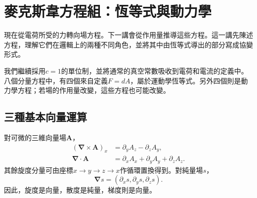 \section{麥克斯韋方程組：恆等式與動力學}

現在從電荷所受的力轉向場方程。下一講會從作用量推導這些方程。這一講先陳述方程，理解它們在邏輯上的兩種不同角色，並將其中由恆等式導出的部分寫成協變形式。

\begin{classroomqa}
\end{classroomqa}

\begin{classroomqa}
\end{classroomqa}

我們繼續採用\(c=1\)的單位制，並將通常的真空常數吸收到電荷和電流的定義中。八個分量方程中，有四個來自定義\(F=dA\)，屬於運動學恆等式。另外四個則是動力學方程；若場的作用量改變，這些方程也可能改變。

\subsection{三種基本向量運算}

對可微的三維向量場\(\mathbf A\)，
\begin{align}
(\boldsymbol\nabla\times\mathbf A)_x
&=
\partial_yA_z-\partial_zA_y,
\\
\boldsymbol\nabla\cdot\mathbf A
&=
\partial_xA_x+\partial_yA_y+\partial_zA_z.
\end{align}
其餘旋度分量可由座標\(x\to y\to z\to x\)作循環置換得到。對純量場\(s\)，
\begin{equation}
\boldsymbol\nabla s
=
(\partial_xs,\partial_ys,\partial_zs).
\end{equation}
因此，旋度是向量，散度是純量，梯度則是向量。

\begin{classroomqa}
\end{classroomqa}

